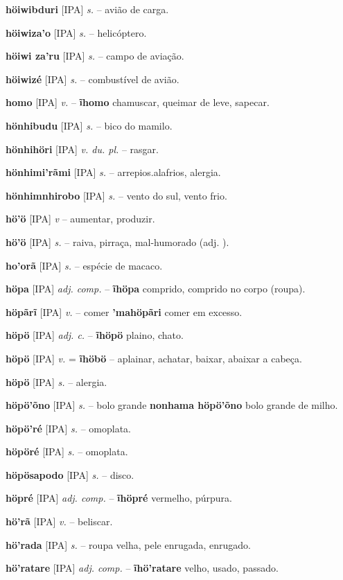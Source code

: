 \textbf{höiwibduri} [IPA] \textit{s.} -- avião de carga.

\textbf{höiwiza'o} [IPA] \textit{s.} -- helicóptero.

\textbf{höiwi za'ru} [IPA] \textit{s.} -- campo de aviação.

\textbf{höiwizé} [IPA] \textit{s.} -- combustível de avião.

\textbf{homo} [IPA] \textit{v.} -- \textbf{ĩhomo} chamuscar, queimar de leve, sapecar.

\textbf{hönhibudu} [IPA] \textit{s.} -- bico do mamilo.

\textbf{hönhihöri} [IPA] \textit{v. du. pl.} -- rasgar.

\textbf{hönhimi'rãmi} [IPA] \textit{s.} -- arrepios.alafrios, alergia.

\textbf{hönhimnhirobo} [IPA] \textit{s.} -- vento do sul, vento frio.

\textbf{hö'ö} [IPA] \textit{v} -- aumentar, produzir.

\textbf{hö'ö} [IPA] \textit{s.} -- raiva, pirraça, mal-humorado (adj. ).

\textbf{ho'orã} [IPA] \textit{s.} -- espécie de macaco.

\textbf{höpa} [IPA] \textit{adj. comp.} -- \textbf{ĩhöpa} comprido, comprido no corpo (roupa).

\textbf{höpãrĩ} [IPA] \textit{v.} -- comer  \textbf{'mahöpãri} comer em excesso.

\textbf{höpö} [IPA] \textit{adj. c.} -- \textbf{ĩhöpö} plaino, chato.

\textbf{höpö} [IPA] \textit{v.} = \textbf{ĩhöbö} -- aplainar, achatar, baixar, abaixar a cabeça.

\textbf{höpö} [IPA] \textit{s.} -- alergia.

\textbf{höpö'õno} [IPA] \textit{s.} -- bolo grande  \textbf{nonhama höpö'õno} bolo grande de milho.

\textbf{höpö'ré} [IPA] \textit{s.} -- omoplata.

\textbf{höpöré} [IPA] \textit{s.} -- omoplata.

\textbf{höpösapodo} [IPA] \textit{s.} -- disco.

\textbf{höpré} [IPA] \textit{adj. comp.} -- \textbf{ĩhöpré} vermelho, púrpura.

\textbf{hö'rã} [IPA] \textit{v.} -- beliscar.

\textbf{hö'rada} [IPA] \textit{s.} -- roupa velha, pele enrugada, enrugado.

\textbf{hö'ratare} [IPA] \textit{adj. comp.} -- \textbf{ĩhö'ratare} velho, usado, passado.

